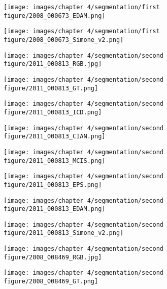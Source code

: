\documentclass[runningheads]{styles/llncs}
\begin{document}
\begin{figure}[t]
\begin{subfigure}[b]{.11\linewidth}
\texttt{[image: images/chapter 4/segmentation/first figure/2008\_000673\_EDAM.png]}
\end{subfigure}
\begin{subfigure}[b]{.11\linewidth}
\texttt{[image: images/chapter 4/segmentation/first figure/2008\_000673\_Simone\_v2.png]}
\end{subfigure}
\begin{subfigure}[b]{.11\linewidth}
\texttt{[image: images/chapter 4/segmentation/second figure/2011\_000813\_RGB.jpg]}
\end{subfigure}
\begin{subfigure}[b]{.11\linewidth}
\texttt{[image: images/chapter 4/segmentation/second figure/2011\_000813\_GT.png]}
\end{subfigure}
\begin{subfigure}[b]{.11\linewidth}
\texttt{[image: images/chapter 4/segmentation/second figure/2011\_000813\_ICD.png]}
\end{subfigure}
\begin{subfigure}[b]{.11\linewidth}
\texttt{[image: images/chapter 4/segmentation/second figure/2011\_000813\_CIAN.png]}
\end{subfigure}
\begin{subfigure}[b]{.11\linewidth}
\texttt{[image: images/chapter 4/segmentation/second figure/2011\_000813\_MCIS.png]}
\end{subfigure}
\begin{subfigure}[b]{.11\linewidth}
\texttt{[image: images/chapter 4/segmentation/second figure/2011\_000813\_EPS.png]}
\end{subfigure}
\begin{subfigure}[b]{.11\linewidth}
\texttt{[image: images/chapter 4/segmentation/second figure/2011\_000813\_EDAM.png]}
\end{subfigure}
\begin{subfigure}[b]{.11\linewidth}
\texttt{[image: images/chapter 4/segmentation/second figure/2011\_000813\_Simone\_v2.png]}
\end{subfigure}
\begin{subfigure}[b]{.11\linewidth}
\texttt{[image: images/chapter 4/segmentation/second figure/2008\_008469\_RGB.jpg]}
\end{subfigure}
\begin{subfigure}[b]{.11\linewidth}
\texttt{[image: images/chapter 4/segmentation/second figure/2008\_008469\_GT.png]}

\end{subfigure}
\end{figure}
\end{document}
